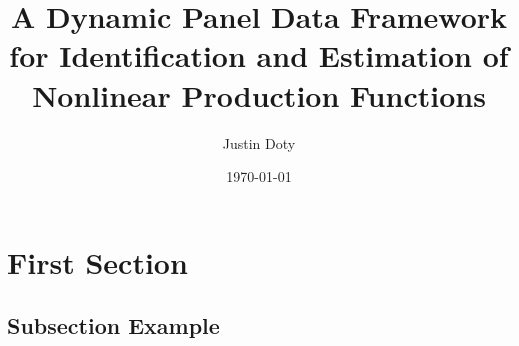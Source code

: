 \documentclass{beamer}
\title[Nonlinear Production Functions]{A Dynamic Panel Data Framework for Identification and Estimation of Nonlinear Production Functions}
\author{Justin Doty} %
\institute[University of Iowa] %
{
\\  
\medskip %
}
\date{\today} %
\begin{document}
\begin{frame}
\titlepage %
\end{frame}


\section{First Section} %

\subsection{Subsection Example} %
\end{document}
